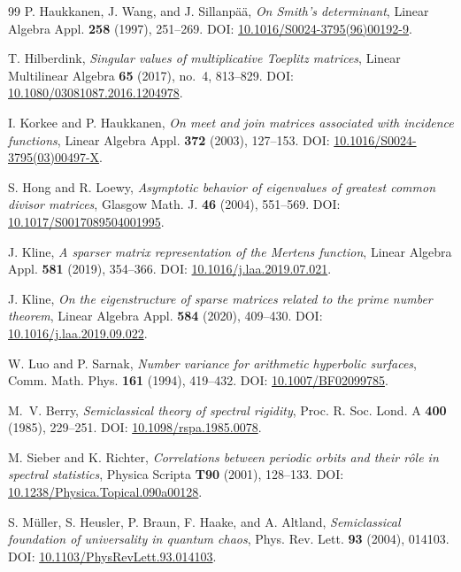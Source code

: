 \documentclass[11pt]{amsart}
\numberwithin{equation}{section}
\theoremstyle{plain}
\theoremstyle{definition}
\theoremstyle{remark}
\begin{document}
\begin{thebibliography}{99}
P. Haukkanen, J. Wang, and J. Sillanp\"a\"a,
\emph{On Smith's determinant},
Linear Algebra Appl. \textbf{258} (1997), 251--269.
DOI: \href{https://doi.org/10.1016/S0024-3795(96)00192-9}{10.1016/S0024-3795(96)00192-9}.

T. Hilberdink,
\emph{Singular values of multiplicative Toeplitz matrices},
Linear Multilinear Algebra \textbf{65} (2017), no.~4, 813--829.
DOI: \href{https://doi.org/10.1080/03081087.2016.1204978}{10.1080/03081087.2016.1204978}.

I. Korkee and P. Haukkanen,
\emph{On meet and join matrices associated with incidence functions},
Linear Algebra Appl. \textbf{372} (2003), 127--153.
DOI: \href{https://doi.org/10.1016/S0024-3795(03)00497-X}{10.1016/S0024-3795(03)00497-X}.

S. Hong and R. Loewy,
\emph{Asymptotic behavior of eigenvalues of greatest common divisor matrices},
Glasgow Math. J. \textbf{46} (2004), 551--569.
DOI: \href{https://doi.org/10.1017/S0017089504001995}{10.1017/S0017089504001995}.

J. Kline,
\emph{A sparser matrix representation of the Mertens function},
Linear Algebra Appl. \textbf{581} (2019), 354--366.
DOI: \href{https://doi.org/10.1016/j.laa.2019.07.021}{10.1016/j.laa.2019.07.021}.

J. Kline,
\emph{On the eigenstructure of sparse matrices related to the prime number theorem},
Linear Algebra Appl. \textbf{584} (2020), 409--430.
DOI: \href{https://doi.org/10.1016/j.laa.2019.09.022}{10.1016/j.laa.2019.09.022}.

W. Luo and P. Sarnak,
\emph{Number variance for arithmetic hyperbolic surfaces},
Comm. Math. Phys. \textbf{161} (1994), 419--432.
DOI: \href{https://doi.org/10.1007/BF02099785}{10.1007/BF02099785}.

M.~V. Berry,
\emph{Semiclassical theory of spectral rigidity},
Proc. R. Soc. Lond. A \textbf{400} (1985), 229--251.
DOI: \href{https://doi.org/10.1098/rspa.1985.0078}{10.1098/rspa.1985.0078}.

M. Sieber and K. Richter,
\emph{Correlations between periodic orbits and their r\^ole in spectral statistics},
Physica Scripta \textbf{T90} (2001), 128--133.
DOI: \href{https://doi.org/10.1238/Physica.Topical.090a00128}{10.1238/Physica.Topical.090a00128}.

S. M\"uller, S. Heusler, P. Braun, F. Haake, and A. Altland,
\emph{Semiclassical foundation of universality in quantum chaos},
Phys. Rev. Lett. \textbf{93} (2004), 014103.
DOI: \href{https://doi.org/10.1103/PhysRevLett.93.014103}{10.1103/PhysRevLett.93.014103}.


\end{thebibliography}
\end{document}
